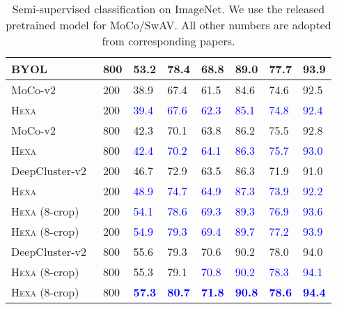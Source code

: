\documentclass[10pt,twocolumn,letterpaper]{article}
\newcommand{\shortname}{\textsc{Hexa}}
\begin{document}
\begin{table}[t!]
\begin{tabular}{@{}lp{18pt}|p{18pt}@{}p{18pt}@{}|p{18pt}@{}p{18pt}|p{18pt}@{}p{18pt}}
BYOL~\cite{grill2020bootstrap} & 800 & 53.2 & 78.4 & 68.8 & 89.0 & 77.7 & 93.9\\
\hline
 MoCo-v2~\cite{chen2020improved} &  200  & 38.9  & 67.4  &  61.5 & 84.6
 & 74.6  & 92.5 \\
\rowcolor{Gray}
\cellcolor{white}
   \shortname{}  &  200   & \textcolor{blue}{39.4}   & \textcolor{blue}{67.6}   &  \textcolor{blue}{62.3}   & \textcolor{blue}{85.1}  & 
   \textcolor{blue}{74.8}   & \textcolor{blue}{92.4} 
  \\ \hline 
 MoCo-v2~\cite{chen2020improved} &  800  & 42.3 &  70.1  & 63.8 &  86.2 & 75.5 & 92.8\\
\rowcolor{Gray}
\cellcolor{white}
   \shortname{}  &  800   & \textcolor{blue}{42.4}  & \textcolor{blue}{70.2}  &  \textcolor{blue}{64.1} & \textcolor{blue}{86.3} & 
    \textcolor{blue}{75.7} & \textcolor{blue}{93.0}
  \\ \hline
 DeepCluster-v2~\cite{caron2018deepcluster,caron2020unsupervised} &  200  & 46.7 & 72.9  & 63.5 & 86.3 & 71.9 &  91.0\\
\rowcolor{Gray}
\cellcolor{white}
   \shortname{}  &  200   & \textcolor{blue}{48.9}  & \textcolor{blue}{74.7}   & \textcolor{blue}{64.9} & \textcolor{blue}{87.3} & 
   \textcolor{blue}{ 73.9} & \textcolor{blue}{92.2} 
  \\  
\rowcolor{Gray}
\cellcolor{white}
   \shortname{} (8-crop)  &  200   & \textcolor{blue}{54.1}  &  \textcolor{blue}{78.6} & \textcolor{blue}{69.3}  &  \textcolor{blue}{89.3} & 
\textcolor{blue}{76.9}  &  \textcolor{blue}{93.6}    
  \\    
\rowcolor{Gray}
\cellcolor{white}
  \shortname{} (8-crop)  &  200 &   \textcolor{blue}{54.9} & \textcolor{blue}{79.3} & \textcolor{blue}{69.4} & \textcolor{blue}{89.7} &
  \textcolor{blue}{77.2}  &  \textcolor{blue}{93.9} 
  \\ \hline
 DeepCluster-v2~\cite{caron2018deepcluster,caron2020unsupervised} &  800  & 55.6 & 79.3  & 70.6 & 90.2 & 78.0 & 94.0 
  \\  
\rowcolor{Gray}
\cellcolor{white}
   \shortname{} (8-crop)  &  800   & 55.3  & 79.1 & \textcolor{blue}{70.8}  &  \textcolor{blue}{90.2} & 
\textcolor{blue}{78.3}  &  \textcolor{blue}{94.1}    
\\
\rowcolor{Gray}
\cellcolor{white}
  \shortname{} (8-crop)  &  800 &   \textcolor{blue}{\textbf{57.3}} & \textcolor{blue}{\textbf{80.7}} & \textcolor{blue}{\textbf{71.8}} & \textcolor{blue}{\textbf{90.8}} & 
  \textcolor{blue}{\textbf{78.6}} & \textcolor{blue}{\textbf{94.4}} \\ 
  


  
\bottomrule
\end{tabular}

\vspace{-1mm}
\caption{Semi-supervised classification on ImageNet. We use the released pretrained model
for MoCo/SwAV. All other numbers are adopted from corresponding papers.}
\label{tab:semisup}
\vspace{-4mm}
\end{table}
\end{document}
